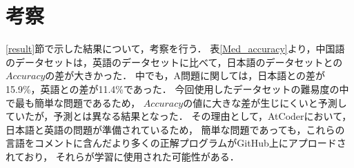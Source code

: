 \section{考察\label{consideration}}
  \ref{result}節で示した結果について，考察を行う．
  表\ref{Med_accuracy}より，中国語のデータセットは，英語のデータセットに比べて，日本語のデータセットとの$Accuracy$の差が大きかった．
  中でも，A問題に関しては，日本語との差が15.9\%，英語との差が11.4\%であった．
  今回使用したデータセットの難易度の中で最も簡単な問題であるため，
  $Accuracy$の値に大きな差が生じにくいと予測していたが，予測とは異なる結果となった．
  その理由として，AtCoder\cite{AtCoder}において，日本語と英語の問題が準備されているため，
  簡単な問題であっても，これらの言語をコメントに含んだより多くの正解プログラムがGitHub上にアプロードされており，
  それらが学習に使用された可能性がある．
  

  